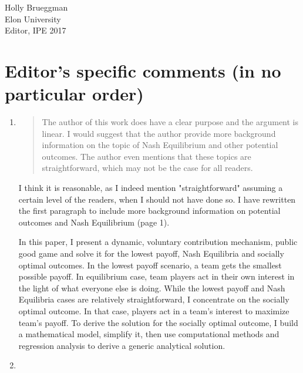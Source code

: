 \documentclass{article}
\newenvironment{itquote}
	{\begin{quote}\itshape}
	{\end{quote}\ignorespacesafterend}
\newenvironment{itpars}
	{\par\itshape}
	{\par}
\begin{document}
	\clearpage

		Holly Brueggman \\
		Elon University  \\
		Editor, IPE 2017

		\section*{Editor's specific comments (in no particular order)}

		\begin{enumerate}
			\item 
				\begin{itquote}

					The author of this work does have a clear purpose and the argument is linear. I would suggest that the author provide more background information on the topic of Nash Equilibrium and other potential outcomes. The author even mentions that these topics are straightforward, which may not be the case for all readers.

				\end{itquote}

				I think it is reasonable, as I indeed mention "straightforward" assuming a certain level of the readers, when I should not have done so. I have rewritten the first paragraph to include more background information on potential outcomes and Nash Equilibrium (page 1).

				\begin{itpars}

					In this paper, I present a dynamic, voluntary contribution mechanism, public good game and solve it for the lowest payoff, Nash Equilibria and socially optimal outcomes. In the lowest payoff scenario, a team gets the smallest possible payoff. In equilibrium case, team players act in their own interest in the light of what everyone else is doing. While the lowest payoff and Nash Equilibria cases are relatively straightforward, I concentrate on the socially optimal outcome. In that case, players act in a team's interest to maximize team's payoff. To derive the solution for the socially optimal outcome, I build a mathematical model, simplify it, then use computational methods and regression analysis to derive a generic analytical solution.

				\end{itpars}

			\item
				
				\begin{itquote}


\end{itquote}
\end{enumerate}
\end{document}
